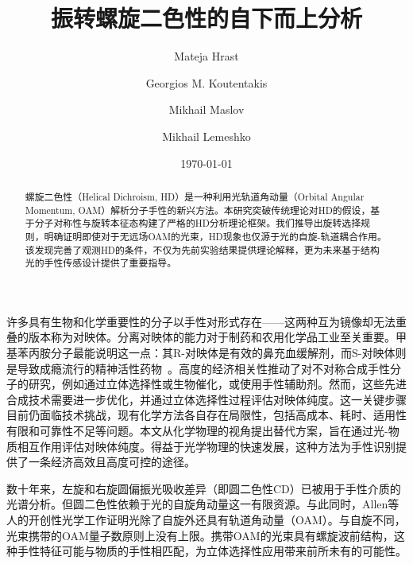 \documentclass[reprint,aps,prl,twocolumn,superscriptaddress,groupedaddress]{revtex4-2}
\begin{document}
\begin{CJK*}{UTF8}{gbsn}
\title{振转螺旋二色性的自下而上分析}
\author{Mateja Hrast}
\author{Georgios M. Koutentakis}
\author{Mikhail Maslov}
\author{Mikhail Lemeshko}
\date{\today}
\begin{abstract}
螺旋二色性（Helical Dichroism, HD）是一种利用光轨道角动量（Orbital Angular Momentum, OAM）解析分子手性的新兴方法。本研究突破传统理论对HD的假设，基于分子对称性与旋转本征态构建了严格的HD分析理论框架。我们推导出旋转选择规则，明确证明即使对于无远场OAM的光束，HD现象也仅源于光的自旋-轨道耦合作用。该发现完善了观测HD的条件，不仅为先前实验结果提供理论解释，更为未来基于结构光的手性传感设计提供了重要指导。
\end{abstract}
\maketitle
许多具有生物和化学重要性的分子以手性对形式存在——这两种互为镜像却无法重叠的版本称为对映体。分离对映体的能力对于制药和农用化学品工业至关重要\cite{MAIER2001}。甲基苯丙胺分子最能说明这一点：其R-对映体是有效的鼻充血缓解剂，而S-对映体则是导致成瘾流行的精神活性药物~\cite{barkholtz2023}。高度的经济相关性推动了对不对称合成手性分子的研究，例如通过立体选择性或生物催化，或使用手性辅助剂\cite{Brown1989}。然而，这些先进合成技术需要进一步优化，并通过立体选择性过程评估对映体纯度。这一关键步骤目前仍面临技术挑战，现有化学方法各自存在局限性，包括高成本、耗时、适用性有限和可靠性不足等问题\cite{qian2023}。本文从化学物理的视角提出替代方案，旨在通过光-物质相互作用评估对映体纯度。得益于光学物理的快速发展\cite{Koch2019}，这种方法为手性识别提供了一条经济高效且高度可控的途径。

数十年来，左旋和右旋圆偏振光吸收差异（即圆二色性CD）\cite{deutsche1970,Holzwarth1974}已被用于手性介质的光谱分析\cite{Miles2021}。但圆二色性依赖于光的自旋角动量这一有限资源。与此同时，Allen等人的开创性光学工作\cite{Allen1992}证明光除了自旋外还具有轨道角动量（OAM）。与自旋不同，光束携带的OAM量子数原则上没有上限。携带OAM的光束具有螺旋波前结构，这种手性特征可能与物质的手性相匹配，为立体选择性应用带来前所未有的可能性。


\end{CJK*}
\end{document}
